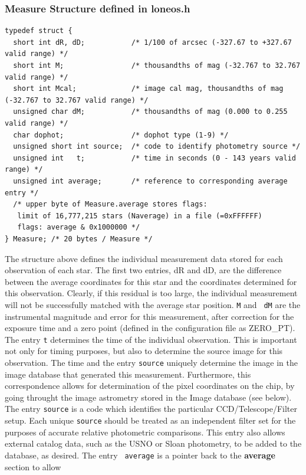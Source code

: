 \documentclass{article}
\begin{document}
\subsubsection*{Measure Structure defined in loneos.h}
{\small
\begin{verbatim}
typedef struct {
  short int dR, dD;           /* 1/100 of arcsec (-327.67 to +327.67 valid range) */
  short int M;                /* thousandths of mag (-32.767 to 32.767 valid range) */
  short int Mcal;             /* image cal mag, thousandths of mag (-32.767 to 32.767 valid range) */
  unsigned char dM;           /* thousandths of mag (0.000 to 0.255 valid range) */
  char dophot;                /* dophot type (1-9) */
  unsigned short int source;  /* code to identify photometry source */
  unsigned int   t;           /* time in seconds (0 - 143 years valid range) */
  unsigned int average;       /* reference to corresponding average entry */
  /* upper byte of Measure.average stores flags:
   limit of 16,777,215 stars (Naverage) in a file (=0xFFFFFF) 
   flags: average & 0x1000000 */
} Measure; /* 20 bytes / Measure */
\end{verbatim}
}
The structure above defines the individual measurement data stored for
each observation of each star.  The first two entries, dR and dD, are
the difference between the average coordinates for this star and the
coordinates determined for this observation.  Clearly, if this
residual is too large, the individual measurement will not be
successfully matched with the average star position.  {\tt M} and {\tt
  dM} are the instrumental magnitude and error for this measurement,
after correction for the exposure time and a zero point (defined in
the configuration file as ZERO\_PT).  The entry {\tt t} determines the
time of the individual observation.  This is important not only for
timing purposes, but also to determine the source image for this
observation.  The time and the entry {\tt source} uniquely determine
the image in the image database that generated this measurement.
Furthermore, this correspondence allows for determination of the pixel
coordinates on the chip, by going throught the image astrometry stored
in the Image database (see below).  The entry {\tt source} is a code which
identifies the particular CCD/Telescope/Filter setup.  Each unique
{\tt source} should be treated as an independent filter set for the
purposes of accurate relative photometric comparisons.  This entry
also allows external catalog data, such as the USNO or Sloan
photometry, to be added to the database, as desired.  The entry {\tt
  average} is a pointer back to the {\bf average} section to allow
\end{document}
